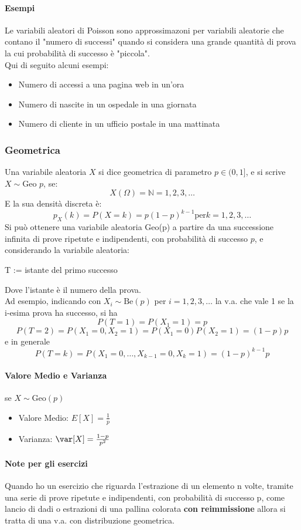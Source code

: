 \paragraph{Esempi}
Le variabili aleatori di Poisson sono approssimazoni per variabili aleatorie che contano il "numero di successi"
quando si considera una grande quantità di prova la cui probabilità di successo è "piccola".
\\ Qui di seguito alcuni esempi:
\begin{itemize}
	\item Numero di accessi a una pagina web in un'ora
	\item Numero di nascite in un ospedale in una giornata
	\item Numero di cliente in un ufficio postale in una mattinata
\end{itemize}

\subsubsection{Geometrica}
Una variabile aleatoria $X$ si dice geometrica di parametro $p \in (0,1]$, e si scrive
$X \sim \text{Geo }p$, se:
\[X(\Omega)=\mathbb{N} = {1,2,3,\dots}\]
E la sua densità discreta è:
\[
	p_X (k) = P(X = k) = p(1-p)^{k-1} \text{per} k=1,2,3,\dots
\]
Si può ottenere una variabile aleatoria Geo(p) a partire da una successione infinita di prove ripetute
e indipendenti, con probabilità di successo $p$, e considerando la variabile aleatoria:
\begin{center}
	T := istante del primo successo
\end{center}
Dove l'istante è il numero della prova.
\\ Ad esempio, indicando con $X_i \sim \text{Be}(p)$ per $i=1,2,3,\dots$ la v.a. che vale 1
se la i-esima prova ha successo, si ha
\[
	P(T=1) = P(X_1 = 1) = p
\]
\[
	P(T=2) = P(X_1 = 0, X_2 = 1) = P(X_1 = 0)P(X_2 = 1) = (1-p)p
\]
e in generale
\[
	P(T=k) = P(X_1=0, \dots, X_{k-1} = 0, X_k = 1) = (1-p)^{k-1}p
\]
\paragraph*{Valore Medio e Varianza} se $X\sim \text{Geo}(p)$
\begin{itemize}
	\item Valore Medio: $E[X] = \frac{1}{p}$
	\item Varianza: $\var[X] = \frac{1-p}{p^2}$
\end{itemize}
\paragraph*{Note per gli esercizi}
Quando ho un esercizio che riguarda l'estrazione di un elemento n volte, tramite una serie
di prove ripetute e indipendenti, con probabilità di successo p, come lancio di dadi o
estrazioni di una pallina colorata \textbf{con reimmissione} allora si tratta di una v.a. con
distribuzione geometrica.


